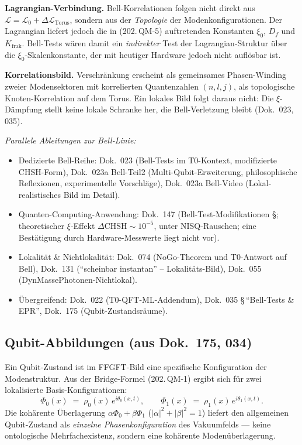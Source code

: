 \textbf{Lagrangian-Verbindung.} Bell-Korrelationen folgen nicht direkt
aus $\mathcal{L} = \mathcal{L}_0 + \Delta\mathcal{L}_{\text{Torus}}$,
sondern aus der \emph{Topologie} der Modenkonfigurationen. Der
Lagrangian liefert jedoch die in (202.\,QM-5) auftretenden Konstanten
$\xi_0$, $D_f$ und $K_{\text{frak}}$. Bell-Tests wären damit ein
\emph{indirekter} Test der Lagrangian-Struktur über die
$\xi_0$-Skalenkonstante, der mit heutiger Hardware jedoch nicht
auflösbar ist.

\textbf{Korrelationsbild.} Verschränkung erscheint als gemeinsames
Phasen-Winding zweier Modensektoren mit korrelierten Quantenzahlen
$(n,l,j)$, als topologische Knoten-Korrelation auf dem Torus. Ein
lokales Bild folgt daraus nicht: Die $\xi$-Dämpfung stellt keine lokale
Schranke her, die Bell-Verletzung bleibt (Dok.~023, 035).

\textit{Parallele Ableitungen zur Bell-Linie:}
\begin{itemize}\setlength\itemsep{0pt}
  \item Dedizierte Bell-Reihe:
        Dok.~023 (Bell-Tests im T0-Kontext, modifizierte CHSH-Form),
        Dok.~023a Bell-Teil2 (Multi-Qubit-Erweiterung, philosophische
        Reflexionen, experimentelle Vorschläge),
        Dok.~023a Bell-Video (Lokal-realistisches Bild im Detail).
  \item Quanten-Computing-Anwendung:
        Dok.~147 (Bell-Test-Modifikationen \S; theoretischer
        $\xi$-Effekt $\Delta\mathrm{CHSH} \sim 10^{-5}$, unter
        NISQ-Rauschen; eine Bestätigung durch Hardware-Messwerte
        liegt nicht vor).
  \item Lokalität \& Nichtlokalität:
        Dok.~074 (NoGo-Theorem und T0-Antwort auf Bell),
        Dok.~131 (\enquote{scheinbar instantan} -- Lokalitäts-Bild),
        Dok.~055 (DynMassePhotonen-Nichtlokal).
  \item Übergreifend:
        Dok.~022 (T0-QFT-ML-Addendum),
        Dok.~035 \S\,\enquote{Bell-Tests \& EPR},
        Dok.~175 (Qubit-Zustandsräume).
\end{itemize}

\subsection*{Qubit-Abbildungen (aus Dok.~175, 034)}

Ein Qubit-Zustand ist im FFGFT-Bild eine spezifische Konfiguration
der Modenstruktur. Aus der Bridge-Formel (202.\,QM-1) ergibt sich für
zwei lokalisierte Basis-Konfigurationen:
\begin{equation}
  \Phi_0(x) \;=\; \rho_0(x)\,e^{i\theta_0(x,t)},
  \qquad
  \Phi_1(x) \;=\; \rho_1(x)\,e^{i\theta_1(x,t)}.
  \tag{202.\,QM-7}
\end{equation}
Die kohärente Überlagerung
$\alpha\Phi_0 + \beta\Phi_1$ ($|\alpha|^2 + |\beta|^2 = 1$) liefert den
allgemeinen Qubit-Zustand als \emph{einzelne Phasenkonfiguration} des
Vakuumfelds --- keine ontologische Mehrfach\-existenz, sondern eine
kohärente Modenüberlagerung.

